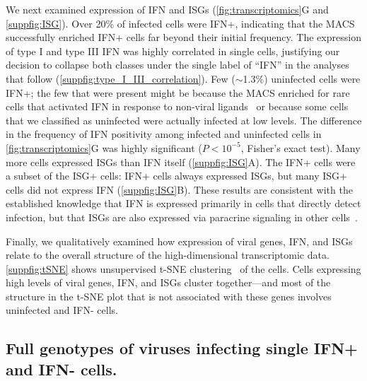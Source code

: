 \documentclass[lineno]{asm-article}
\newcommand{\FIG}[1]{\autoref{fig:#1}}
\newcommand{\SUPPFIG}[1]{\autoref{suppfig:#1}}
\begin{document}
We next examined expression of IFN and ISGs (\FIG{transcriptomics}G and \SUPPFIG{ISG}).
Over 20\% of infected cells were IFN+, indicating that the MACS successfully enriched IFN+ cells far beyond their initial frequency.
The expression of type I and type III IFN was highly correlated in single cells, justifying our decision to collapse both classes under the single label of ``IFN'' in the analyses that follow (\SUPPFIG{type_I_III_correlation}).
Few ($\sim$1.3\%) uninfected cells were IFN+; the few that were present might be because the MACS enriched for rare cells that activated IFN in response to non-viral ligands~\cite{dhir2018mitochondrial, benitez2015vivo, chiang2018viral} or because some cells that we classified as uninfected were actually infected at low levels.
The difference in the frequency of IFN positivity among infected and uninfected cells in \FIG{transcriptomics}G was highly significant ($P < 10^{-5}$, Fisher's exact test).
Many more cells expressed ISGs than IFN itself (\SUPPFIG{ISG}A).
The IFN+ cells were a subset of the ISG+ cells: IFN+ cells always expressed ISGs, but many ISG+ cells did not express IFN (\SUPPFIG{ISG}B).
These results are consistent with the established knowledge that IFN is expressed primarily in cells that directly detect infection, but that ISGs are also expressed via paracrine signaling in other cells~\cite{stetson2006type,honda2006type}.

Finally, we qualitatively examined how expression of viral genes, IFN, and ISGs relate to the overall structure of the high-dimensional transcriptomic data.
\SUPPFIG{tSNE} shows unsupervised t-SNE clustering~\cite{maaten2008visualizing} of the cells.
Cells expressing high levels of viral genes, IFN, and ISGs cluster together---and most of the structure in the t-SNE plot that is not associated with these genes involves uninfected and IFN- cells.

\subsection{Full genotypes of viruses infecting single IFN+ and IFN- cells.}
\end{document}
